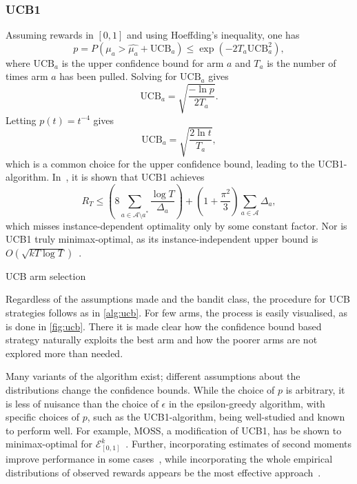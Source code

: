 \subsubsection{UCB1}
Assuming rewards in $[0,1]$ and using Hoeffding's inequality, one has
\begin{equation}
    p
    = P(\mu_a > \hat{\mu_a} + \text{UCB}_a)
    \leq \exp(-2T_a \text{UCB}_a^2),
\end{equation}
where $\text{UCB}_a$ is the upper confidence bound for arm $a$ and $T_a$ is the number of times arm $a$ has been pulled.
Solving for $\text{UCB}_a$ gives
\begin{equation}
    \text{UCB}_a = \sqrt{\frac{-\ln p}{2T_a}}.
\end{equation}
Letting $p(t) = t^{-4}$ gives
\begin{equation}
    \text{UCB}_a = \sqrt{\frac{2 \ln t}{T_a}},
\end{equation}
which is a common choice for the upper confidence bound, leading to the UCB1-algorithm.
In~\autocite{auer2002}, it is shown that UCB1 achieves
\begin{equation}
    R_T
    \leq
    \left( 8 \sum_{a \in \mathcal{A} \setminus a^*} \frac{\log T}{\Delta_a} \right)
    + \left(1 + \frac{\pi^2}{3}\right) \sum_{a \in \mathcal{A}} \Delta_a,
\end{equation}
which misses instance-dependent optimality only by some constant factor.
Nor is UCB1 truly minimax-optimal, as its instance-independent upper bound is $O(\sqrt{kT \log T})$~\autocite{bubeck2012}.

\begin{algorithm}
    \caption{UCB arm selection}
    \label{alg:ucb}
     
\end{algorithm}


Regardless of the assumptions made and the bandit class, the procedure for UCB strategies follows as in \cref{alg:ucb}.
For few arms, the process is easily visualised, as is done in \cref{fig:ucb}.
There it is made clear how the confidence bound based strategy naturally exploits the best arm and how the poorer arms are not explored more than needed.

Many variants of the algorithm exist; different assumptions about the distributions change the confidence bounds.
While the choice of $p$ is arbitrary, it is less of nuisance than the choice of $\epsilon$ in the epsilon-greedy algorithm, with specific choices of $p$, such as the UCB1-algorithm, being well-studied and known to perform well.
For example, MOSS, a modification of UCB1, has be shown to minimax-optimal for $\mathcal{E}_{[0,1]}^k$~\autocite{audibert2009}.
Further, incorporating estimates of second moments improve performance in some cases~\autocite{audibert2009a}, while incorporating the whole empirical distributions of observed rewards appears be the most effective approach~\autocite{maillard2011}.


